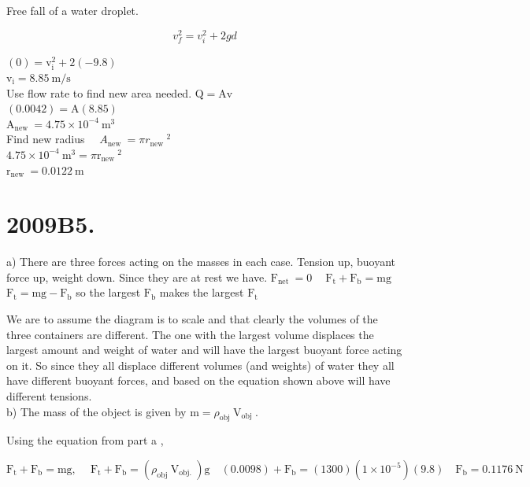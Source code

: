 \begin{enumerate}
Free fall of a water droplet.


\begin{equation*}
v_{f}^{2}=v_{i}^{2}+2 g d \tag{4}
\end{equation*}


$(0)=\mathrm{v}_{\mathrm{i}}^{2}+2(-9.8)$\\
$\mathrm{v}_{\mathrm{i}}=8.85 \mathrm{~m} / \mathrm{s}$\\
Use flow rate to find new area needed. $\mathrm{Q}=\mathrm{Av}$\\
$(0.0042)=\mathrm{A}(8.85)$\\
$\mathrm{A}_{\text {new }}=4.75 \times 10^{-4} \mathrm{~m}^{3}$\\
Find new radius $\quad A_{\text {new }}=\pi r_{\text {new }}{ }^{2}$\\
$4.75 \times 10^{-4} \mathrm{~m}^{3}=\pi \mathrm{r}_{\text {new }}{ }^{2}$\\
$\mathrm{r}_{\text {new }}=0.0122 \mathrm{~m}$

\section*{2009B5.}
a) There are three forces acting on the masses in each case. Tension up, buoyant force up, weight down. Since they are at rest we have. $\mathrm{F}_{\text {net }}=0 \quad \mathrm{~F}_{\mathrm{t}}+\mathrm{F}_{\mathrm{b}}=\mathrm{mg}$\\
$\mathrm{F}_{\mathrm{t}}=\mathrm{mg}-\mathrm{F}_{\mathrm{b}}$ so the largest $\mathrm{F}_{\mathrm{b}}$ makes the largest $\mathrm{F}_{\mathrm{t}}$

We are to assume the diagram is to scale and that clearly the volumes of the three containers are different. The one with the largest volume displaces the largest amount and weight of water and will have the largest buoyant force acting on it. So since they all displace different volumes (and weights) of water they all have different buoyant forces, and based on the equation shown above will have different tensions.\\
b) The mass of the object is given by $\mathrm{m}=\rho_{\text {obj }} \mathrm{V}_{\text {obj }}$.

Using the equation from part a ,

$$
\mathrm{F}_{\mathrm{t}}+\mathrm{F}_{\mathrm{b}}=\mathrm{mg}, \quad \mathrm{~F}_{\mathrm{t}}+\mathrm{F}_{\mathrm{b}}=\left(\rho_{\text {obj }} \mathrm{V}_{\text {obj. }}\right) \mathrm{g} \quad(0.0098)+\mathrm{F}_{\mathrm{b}}=(1300)\left(1 \times 10^{-5}\right)(9.8) \quad \mathrm{F}_{\mathrm{b}}=0.1176 \mathrm{~N}
$$


\end{enumerate}
